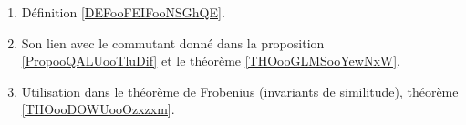 
    \begin{enumerate}
        \item
            Définition \ref{DEFooFEIFooNSGhQE}.
        \item
            Son lien avec le commutant donné dans la proposition \ref{PropooQALUooTluDif} et le théorème \ref{THOooGLMSooYewNxW}.
        \item
            Utilisation dans le théorème de Frobenius (invariants de similitude), théorème \ref{THOooDOWUooOzxzxm}.
        \end{enumerate}

